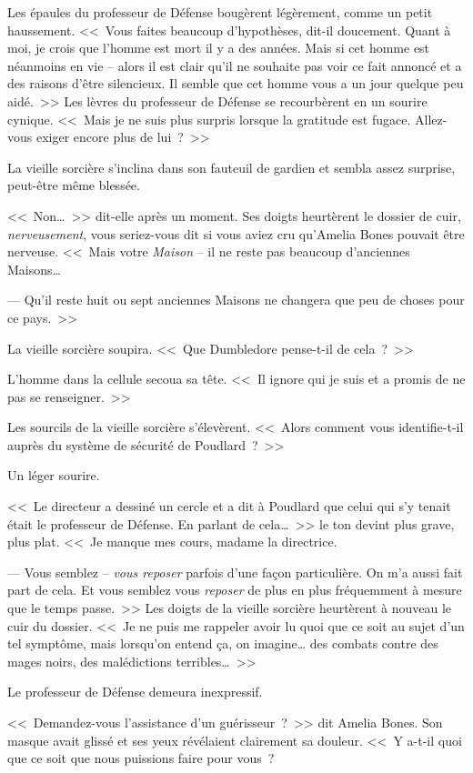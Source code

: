 Les épaules du professeur de Défense bougèrent légèrement, comme un petit haussement. <<~Vous faites beaucoup d'hypothèses, dit-il doucement. Quant à moi, je crois que l'homme est mort il y a des années. Mais si cet homme est néanmoins en vie -- alors il est clair qu'il ne souhaite pas voir ce fait annoncé et a des raisons d'être silencieux. Il semble que cet homme vous a un jour quelque peu aidé.~>> Les lèvres du professeur de Défense se recourbèrent en un sourire cynique. <<~Mais je ne suis plus surpris lorsque la gratitude est fugace. Allez-vous exiger encore plus de lui~?~>>

La vieille sorcière s'inclina dans son fauteuil de gardien et sembla assez surprise, peut-être même blessée.

<<~Non…~>> dit-elle après un moment. Ses doigts heurtèrent le dossier de cuir, \emph{nerveusement}, vous seriez-vous dit si vous aviez cru qu'Amelia Bones pouvait être nerveuse. <<~Mais votre \emph{Maison} -- il ne reste pas beaucoup d'anciennes Maisons…

--- Qu'il reste huit ou sept anciennes Maisons ne changera que peu de choses pour ce pays.~>>

La vieille sorcière soupira. <<~Que Dumbledore pense-t-il de cela~?~>>

L'homme dans la cellule secoua sa tête. <<~Il ignore qui je suis et a promis de ne pas se renseigner.~>>

Les sourcils de la vieille sorcière s'élevèrent. <<~Alors comment vous identifie-t-il auprès du système de sécurité de Poudlard~?~>>

Un léger sourire.

<<~Le directeur a dessiné un cercle et a dit à Poudlard que celui qui s'y tenait était le professeur de Défense. En parlant de cela…~>> le ton devint plus grave, plus plat. <<~Je manque mes cours, madame la directrice.

--- Vous semblez -- \emph{vous reposer} parfois d'une façon particulière. On m'a aussi fait part de cela. Et vous semblez vous \emph{reposer} de plus en plus fréquemment à mesure que le temps passe.~>> Les doigts de la vieille sorcière heurtèrent à nouveau le cuir du dossier. <<~Je ne puis me rappeler avoir lu quoi que ce soit au sujet d'un tel symptôme, mais lorsqu'on entend ça, on imagine… des combats contre des mages noirs, des malédictions terribles…~>>

Le professeur de Défense demeura inexpressif.

<<~Demandez-vous l'assistance d'un guérisseur~?~>> dit Amelia Bones. Son masque avait glissé et ses yeux révélaient clairement sa douleur. <<~Y a-t-il quoi que ce soit que nous puissions faire pour vous~?

